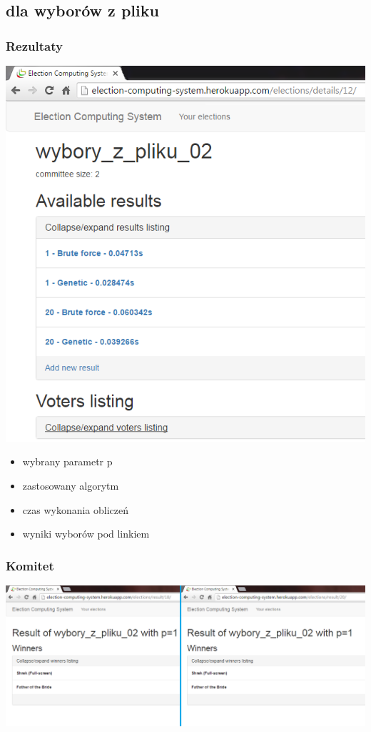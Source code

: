 \documentclass{beamer}
\begin{document}
\subsection{dla wyborów z pliku}
\begin{frame}
\frametitle{Rezultaty}
\begin{multicols}{2}
\includegraphics[height=0.5\paperheight]{screenshots/13_other_results.png}
\begin{itemize}
\item wybrany parametr p
\item zastosowany algorytm
\item czas wykonania obliczeń
\item wyniki wyborów pod linkiem
\end{itemize}
\end{multicols}
\end{frame}
\begin{frame}
\frametitle{Komitet}
\includegraphics[width=0.8\paperwidth]{screenshots/15_genetic_brute_p1.png}
\end{frame}
\end{document}
